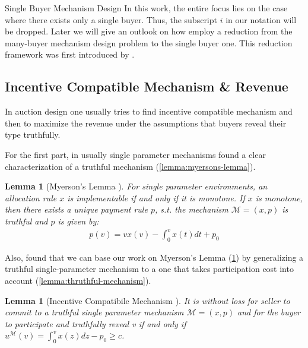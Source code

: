 \documentclass[11pt,a4paper]{article}
\newtheorem{lemma}[theorem]{Lemma}
\newcommand{\1}[1]{\mbox{\rm\bf 1}_{#1}}
\begin{document}
\begin{section}{Single Buyer Mechanism Design}
 In this work, the entire focus lies on the case where there exists only a single buyer.
 Thus, the subscript $i$ in our notation will be dropped.
 Later we will give an outlook on how \citet{primary} employ a reduction from the many-buyer mechanism design problem to the single buyer one.
 This reduction framework was first introduced by \citet{alaei2012bayesian,alaei2014bayesian}.

 \subsection{Incentive Compatible Mechanism \& Revenue}
 \label{sec:incentive-comptaible-mechanism-revenue}
 In auction design one usually tries to find incentive compatible mechanism and then to maximize the revenue under the assumptions that buyers reveal their type truthfully.

 For the first part, in usually single parameter mechanisms \citet{myerson} found a clear characterization of a truthful mechanism (\autoref{lemma:myersons-lemma}).

 \begin{lemma}[Myerson's Lemma \cite{myerson}]
     \label{lemma:myersons-lemma}
     For single parameter environments, an allocation rule $x$ is implementable if and only if it is monotone.
     If $x$ is monotone, then there exists a unique payment rule $p$, s.t. the mechanism $\mathcal{M}=(x,p)$ is truthful
     and $p$ is given by:
     \begin{align*}
         p(v) = v x(v) - \int_0^v x(t) dt + p_0
     \end{align*}
 \end{lemma}

 Also, \citet{primary} found that we can base our work on Myerson's Lemma (\ref{lemma:myersons-lemma})
 by generalizing a truthful single-parameter mechanism to a one that takes participation cost into account (\autoref{lemma:thruthful-mechanism}).

 \begin{lemma}[Incentive Compatibile Mechanism \cite{primary}]
     \label{lemma:thruthful-mechanism}
     It is without loss for seller to commit to a truthful single parameter mechanism $\mathcal{M}=(x,p)$ and
     for the buyer to participate and truthfully reveal v if and only if $u^\mathcal{M}(v) = \int_0^v x(z)dz - p_0 \geq c$.
 \end{lemma}


\end{section}
\end{document}
